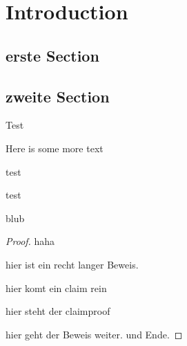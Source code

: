 \chapter{Introduction}
\label{ch:introduction}




\section{erste Section}
\label{sec:erste-section}


\section{zweite Section}
\label{sec:zweite-section}

\blindtext 

\begin{definition}
  Test
\end{definition}

Here is some more text

\begin{definition}
  test
\end{definition}

\begin{theorem*}[thmtitel]
  test
\end{theorem*}

\blindtext

\begin{theorem}
  blub
\end{theorem}


\begin{proof}
  haha

  hier ist ein recht langer Beweis.

  \blindtext

  \begin{claim}
    hier komt ein claim rein
  \end{claim}

  \begin{claimproof}{}
    hier steht der claimproof
  \end{claimproof}
  
  hier geht der Beweis weiter. \blindtext
  und Ende.
\end{proof}

\blindtext


